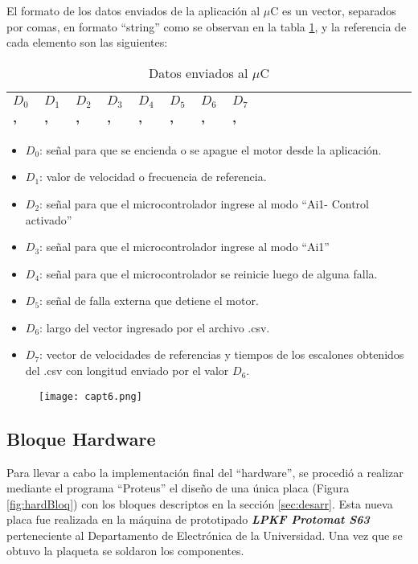 \begin{enumerate}
El formato de los datos enviados de la aplicación al $\mu$C es un vector, separados por comas, en formato “string” como se observan en la tabla \ref{tab:Datosenviados}, y la referencia de cada elemento son las siguientes:

\begin{table}[H]
	\centering
	\begin{tabular}{|l|l|l|l|l|l|l|l|l|l|l|l|l|l|l|l|l|l|l|l|}
		\hline
			$D_0$ , & $D_1$ , & $D_2$ , & $D_3$ , & $D_4$ , & $D_5$ , & $D_6$ ,  & $D_7$ , \\ \hline
	\end{tabular}
\caption{Datos enviados al $\mu$C}
\label{tab:Datosenviados}
\end{table}

\begin{itemize}
\item $D_0$: señal para que se encienda o se apague el motor desde la aplicación.
\item $D_1$: valor de velocidad o frecuencia de referencia.
\item $D_2$: señal para que el microcontrolador ingrese al modo “Ai1- Control activado”
\item $D_3$: señal para que el microcontrolador ingrese al modo “Ai1”
\item $D_4$: señal para que el microcontrolador se reinicie luego de alguna falla.
\item $D_5$: señal de falla externa que detiene el motor.
\item $D_6$: largo del vector ingresado por el archivo .csv.
\item $D_7$: vector de velocidades de referencias y tiempos de los escalones obtenidos del .csv con longitud enviado por el valor $D_6$.
\end{itemize}	

\end{enumerate}
\begin{figure}[H]
	\centering
	\texttt{[image: capt6.png]}
	\label{fig:capt6}
\end{figure}

\subsection{Bloque Hardware} \label{sec:hard}

Para llevar a cabo la implementación final del “hardware”, se procedió a realizar mediante el programa “Proteus” el diseño de una única placa (Figura \ref{fig:hardBloq}) con los bloques descriptos en la sección \ref{sec:desarr}. Esta nueva placa fue realizada en la máquina de prototipado \textbf{\textit{LPKF Protomat S63}} perteneciente al Departamento de Electrónica de la Universidad. Una vez que se obtuvo la plaqueta se soldaron los componentes.  

